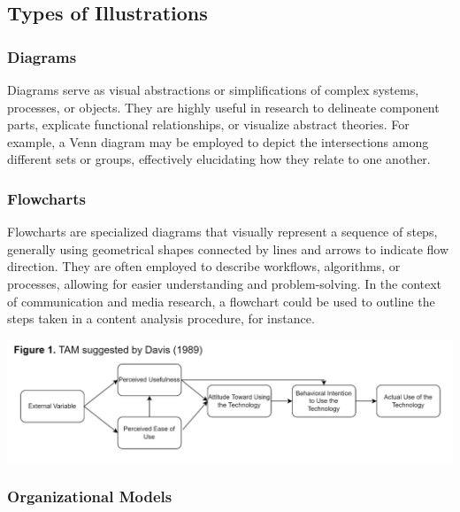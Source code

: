 \documentclass[
  b5paper]{book}
\begin{document}
\hypertarget{types-of-illustrations}{%
\subsection*{Types of Illustrations}\label{types-of-illustrations}}

\hypertarget{diagrams}{%
\subsubsection*{Diagrams}\label{diagrams}}

Diagrams serve as visual abstractions or simplifications of complex systems, processes, or objects. They are highly useful in research to delineate component parts, explicate functional relationships, or visualize abstract theories. For example, a Venn diagram may be employed to depict the intersections among different sets or groups, effectively elucidating how they relate to one another.

\hypertarget{flowcharts}{%
\subsubsection*{Flowcharts}\label{flowcharts}}

Flowcharts are specialized diagrams that visually represent a sequence of steps, generally using geometrical shapes connected by lines and arrows to indicate flow direction. They are often employed to describe workflows, algorithms, or processes, allowing for easier understanding and problem-solving. In the context of communication and media research, a flowchart could be used to outline the steps taken in a content analysis procedure, for instance.

\includegraphics[width=1\textwidth,height=\textheight]{images/model.png}

\hypertarget{organizational-models}{%
\subsubsection*{Organizational Models}\label{organizational-models}}
\end{document}
